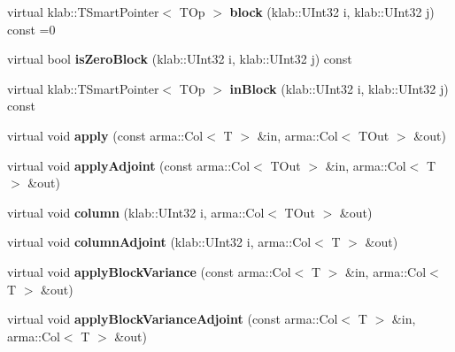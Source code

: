 \begin{DoxyCompactItemize}
\item 
virtual klab\+::\+T\+Smart\+Pointer$<$ T\+Op $>$ {\bfseries block} (klab\+::\+U\+Int32 i, klab\+::\+U\+Int32 j) const =0\hypertarget{classkl1p_1_1TBlockOperator_a818d8197561091b57eb68da45984e862}{}\label{classkl1p_1_1TBlockOperator_a818d8197561091b57eb68da45984e862}

\item 
virtual bool {\bfseries is\+Zero\+Block} (klab\+::\+U\+Int32 i, klab\+::\+U\+Int32 j) const \hypertarget{classkl1p_1_1TBlockOperator_a38f14ee4289d3a1022621fd2756468a0}{}\label{classkl1p_1_1TBlockOperator_a38f14ee4289d3a1022621fd2756468a0}

\item 
virtual klab\+::\+T\+Smart\+Pointer$<$ T\+Op $>$ {\bfseries in\+Block} (klab\+::\+U\+Int32 i, klab\+::\+U\+Int32 j) const \hypertarget{classkl1p_1_1TBlockOperator_abe27ac7aae020a0046b41dbbce833c2e}{}\label{classkl1p_1_1TBlockOperator_abe27ac7aae020a0046b41dbbce833c2e}

\item 
virtual void {\bfseries apply} (const arma\+::\+Col$<$ T $>$ \&in, arma\+::\+Col$<$ T\+Out $>$ \&out)\hypertarget{classkl1p_1_1TBlockOperator_abe8347dc36f51357b31019202e6519f6}{}\label{classkl1p_1_1TBlockOperator_abe8347dc36f51357b31019202e6519f6}

\item 
virtual void {\bfseries apply\+Adjoint} (const arma\+::\+Col$<$ T\+Out $>$ \&in, arma\+::\+Col$<$ T $>$ \&out)\hypertarget{classkl1p_1_1TBlockOperator_a16f5ca78ef3004162ed0bec64a33f2a7}{}\label{classkl1p_1_1TBlockOperator_a16f5ca78ef3004162ed0bec64a33f2a7}

\item 
virtual void {\bfseries column} (klab\+::\+U\+Int32 i, arma\+::\+Col$<$ T\+Out $>$ \&out)\hypertarget{classkl1p_1_1TBlockOperator_afd7fe16a9a975d78d04c08f0d4840585}{}\label{classkl1p_1_1TBlockOperator_afd7fe16a9a975d78d04c08f0d4840585}

\item 
virtual void {\bfseries column\+Adjoint} (klab\+::\+U\+Int32 i, arma\+::\+Col$<$ T $>$ \&out)\hypertarget{classkl1p_1_1TBlockOperator_aaba087da87a91484c87e034ca1cb24c8}{}\label{classkl1p_1_1TBlockOperator_aaba087da87a91484c87e034ca1cb24c8}

\item 
virtual void {\bfseries apply\+Block\+Variance} (const arma\+::\+Col$<$ T $>$ \&in, arma\+::\+Col$<$ T $>$ \&out)\hypertarget{classkl1p_1_1TBlockOperator_a9f7a58f4ad532f72761cadb0dcb37ffe}{}\label{classkl1p_1_1TBlockOperator_a9f7a58f4ad532f72761cadb0dcb37ffe}

\item 
virtual void {\bfseries apply\+Block\+Variance\+Adjoint} (const arma\+::\+Col$<$ T $>$ \&in, arma\+::\+Col$<$ T $>$ \&out)\hypertarget{classkl1p_1_1TBlockOperator_aa3603d90acc99c1f6b43578b8701ecb9}{}\label{classkl1p_1_1TBlockOperator_aa3603d90acc99c1f6b43578b8701ecb9}

\end{DoxyCompactItemize}

